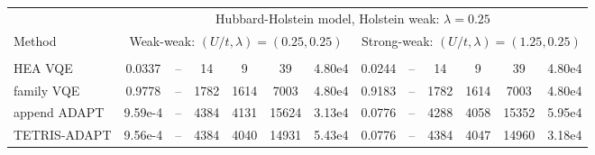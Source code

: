 \documentclass[
  reprint,
  amsmath,
  amssymb,
  aps,
  pra,
  nofootinbib,
  superscriptaddress,
  floatfix
]{revtex4-2}
\newcommand{\metrichead}[1]{\makebox[0.061\textwidth][c]{#1}}
\begin{document}
\begin{widetext}
\begin{minipage}{\textwidth}
\begin{center}
\footnotesize
\setlength{\tabcolsep}{1.15pt}
\renewcommand{\arraystretch}{1.08}
\begin{ruledtabular}
\begin{tabular}{p{}cccccc|cccccc}
& \multicolumn{12}{c}{Hubbard-Holstein model, Holstein weak: $\lambda=0.25$}\\
\cline{2-13}
Method & \multicolumn{6}{c|}{Weak-weak: $(U/t,\lambda)=(0.25,0.25)$} & \multicolumn{6}{c}{Strong-weak: $(U/t,\lambda)=(1.25,0.25)$}\\
\cline{2-7}\cline{8-13}
 & \metrichead{$\Delta E$} & \metrichead{$1-F$} & \metrichead{$N_{2q}$} & \metrichead{$D_{2q}$} & \metrichead{$D_c$} & \metrichead{$S$} & \metrichead{$\Delta E$} & \metrichead{$1-F$} & \metrichead{$N_{2q}$} & \metrichead{$D_{2q}$} & \metrichead{$D_c$} & \metrichead{$S$}\\
\colrule
HEA VQE & 0.0337 & -- & 14 & 9 & 39 & 4.80e4 & 0.0244 & -- & 14 & 9 & 39 & 4.80e4\\
family VQE & 0.9778 & -- & 1782 & 1614 & 7003 & 4.80e4 & 0.9183 & -- & 1782 & 1614 & 7003 & 4.80e4\\
append ADAPT & 9.59e-4 & -- & 4384 & 4131 & 15624 & 3.13e4 & 0.0776 & -- & 4288 & 4058 & 15352 & 5.95e4\\
TETRIS-ADAPT & 9.56e-4 & -- & 4384 & 4040 & 14931 & 5.43e4 & 0.0776 & -- & 4384 & 4047 & 14960 & 3.18e4\\

\end{tabular}
\end{ruledtabular}
\end{center}
\end{minipage}
\end{widetext}
\end{document}
